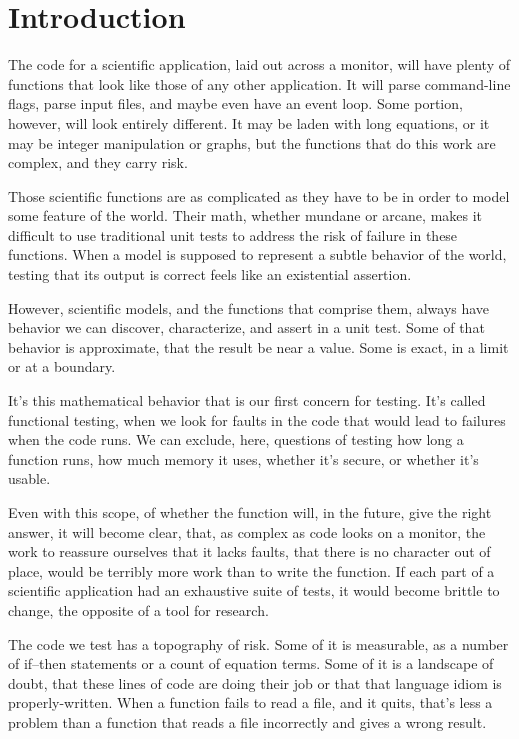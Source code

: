 \documentclass[fleqn,10pt]{olplainarticle}
\begin{document}
\tableofcontents
\section{Introduction}\label{sec:introduction}

The code for a scientific application, laid out across a monitor,
will have plenty of functions that look like those of any other application.
It will parse command-line flags, parse input files, and maybe even have
an event loop. Some portion, however, will look entirely different. It
may be laden with long equations, or it may be integer manipulation or
graphs, but the functions that do this work are complex, and they carry risk.

Those scientific functions are as complicated as they have to be
in order to model some feature of the world. Their math, whether mundane
or arcane, makes it difficult to use traditional unit tests to address
the risk of failure in these functions. When a model is supposed to represent
a subtle behavior of the world, testing that its output is correct feels
like an existential assertion.

However, scientific models, and the functions that comprise them,
always have behavior we can discover, characterize, and assert in a unit
test. Some of that behavior is approximate, that the result be near a
value. Some is exact, in a limit or at a boundary.

It's this mathematical behavior that is our first concern for testing.
It's called functional testing, when we look for faults in the code
that would lead to failures when the code runs. We can exclude, here,
questions of testing how long a function runs, how much memory it uses,
whether it's secure, or whether it's usable.

Even with this scope, of whether the function will, in the future,
give the right answer, it will become clear, that, as complex as
code looks on a monitor, the work to reassure ourselves that it lacks
faults, that there is no character out of place, would be terribly more
work than to write the function. If each part of a scientific application
had an exhaustive suite of tests, it would become brittle to change,
the opposite of a tool for research.

The code we test has a topography of risk. Some of it is measurable,
as a number of if--then statements or a count of equation terms.
Some of it is a landscape of doubt, that these lines of code are
doing their job or that that language idiom is properly-written.
When a function fails to read a file, and it quits, that's less
a problem than a function that reads a file incorrectly and gives
a wrong result.
\end{document}
